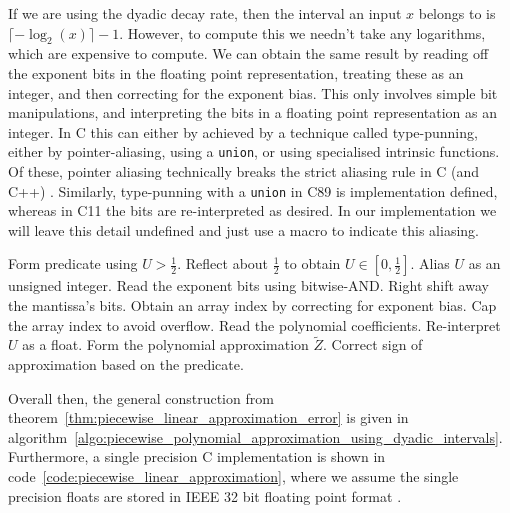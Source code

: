 \documentclass[manuscript,review]{acmart}
\begin{document}
If we are using the dyadic decay rate, then the interval an input $ x $  belongs to is $ \lceil -{\log}_2(x) \rceil - 1 $. However, to compute this we needn't take any logarithms, which are expensive to compute. We can obtain the same result by reading off the exponent bits in the floating point representation, treating these as an integer, and then correcting for the exponent bias.  This only involves simple bit manipulations, and interpreting the bits in a floating point representation as an integer. In C this can either by achieved by a technique called type-punning, either by pointer-aliasing, using a \texttt{union}, or using specialised intrinsic functions. Of these, pointer aliasing technically breaks the strict aliasing rule in C (and C++) \citep[6.5.2.3]{iso2012c11} \citep[pages~163--164]{stallman2020gcc}. Similarly, type-punning with a \texttt{union} in C89 is implementation defined, whereas in C11 the bits are re-interpreted as desired. In our implementation we will leave this detail undefined and just use a macro to indicate this aliasing. 

\begin{algorithm}[h!tb]
\DontPrintSemicolon
\KwIn{Floating-point uniform random variable $ U \in [0, 1) $.}
Form predicate using $ U > \tfrac{1}{2} $.\;
Reflect about $ \tfrac{1}{2} $ to obtain $ U \in [0, \tfrac{1}{2}] $.\;
Alias $ U $ as an unsigned integer.\;
Read the exponent bits using bitwise-AND.\;
Right shift away the mantissa's bits.\;
Obtain an array index by correcting for exponent bias.\;
Cap the array index to avoid overflow.\;
Read the polynomial coefficients.\;
Re-interpret $ U $ as a float.\;
Form the polynomial approximation $ \tilde{Z} $.\;
Correct sign of approximation based on the predicate.\;
\caption{Piecewise polynomial approximation using dyadic intervals.}
\label{algo:piecewise_polynomial_approximation_using_dyadic_intervals}
\end{algorithm}

Overall then, the general construction from theorem~\ref{thm:piecewise_linear_approximation_error} is given in algorithm~\ref{algo:piecewise_polynomial_approximation_using_dyadic_intervals}. Furthermore, a single precision C implementation is shown in code~\ref{code:piecewise_linear_approximation}, where we assume the single precision floats are stored in IEEE 32 bit floating point format \citep{ieee2008ieee}. 
\end{document}
